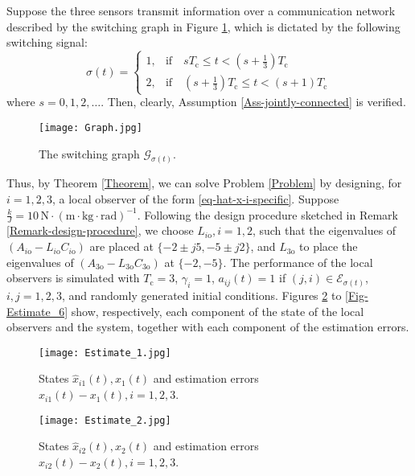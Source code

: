 \documentclass[twocolumn]{autart}
\begin{document}
Suppose the three sensors transmit information over a communication network
described by the switching graph in Figure \ref{Fig-Graph},
which is dictated by the following switching signal:
\begin{equation*}
    \sigma(t)=
    \begin{cases}
   1, & \text{if}\quad  s T_{\text{c}} \le t < \left(s+\frac{1}{3}\right) T_{\text{c}}   \\
   2, & \text{if}\quad  \left(s+\frac{1}{3}\right)T_{\text{c}} \le t < (s+1) T_{\text{c}}
    \end{cases}
\end{equation*}
where $s=0,1,2,\ldots$. Then, clearly, Assumption \ref{Ass-jointly-connected} is verified.

\begin{figure}
  \centering
  \texttt{[image: Graph.jpg]}\\
  \caption{The switching graph $\mathcal{G}_{\sigma(t)}$.}\label{Fig-Graph}
\end{figure}

Thus, by Theorem \ref{Theorem}, we can solve Problem \ref{Problem}
by designing, for $i=1,2,3$, a local observer of the form \eqref{eq-hat-x-i-specific}.
Suppose $\frac{k}{J}=10\, \mathrm{N} \cdot (\mathrm{m \cdot kg \cdot rad})^{-1}$.
Following the design procedure sketched in Remark \ref{Remark-design-procedure},
we choose $L_{i\text{o}}, i=1,2$, such that the eigenvalues of $(A_{i\text{o}}-L_{i\text{o}}C_{i\text{o}})$ are
placed at $\{-2\pm j 5, -5\pm j 2\}$,
and $L_{3\text{o}}$ to place the eigenvalues of $(A_{3\text{o}}-L_{3\text{o}}C_{3\text{o}})$ at $\{-2,-5\}$.
The performance of the local observers is simulated with
$T_{\text{c}}=3$, $\gamma_{i}=1$, $a_{ij}(t)=1$ if $(j,i) \in \mathcal{E}_{\sigma(t)}$, $i,j=1,2,3$, and
randomly generated initial conditions.
Figures \ref{Fig-Estimate_1} to \ref{Fig-Estimate_6} show, respectively,
each component of the state of the local observers and the system,
together with each component of the estimation errors.


\begin{figure}
\centering
  \texttt{[image: Estimate\_1.jpg]}\\
  \caption{States $\hat{x}_{i1}(t), x_{1}(t)$ and estimation errors $\hat{x}_{i1}(t)-x_{1}(t),i=1,2,3$.}\label{Fig-Estimate_1}
\end{figure}


\begin{figure}
\centering
  \texttt{[image: Estimate\_2.jpg]}\\
  \caption{States $\hat{x}_{i2}(t), x_{2}(t)$ and estimation errors $\hat{x}_{i2}(t)-x_{2}(t),i=1,2,3$.}\label{Fig-Estimate_2}
\end{figure}
\end{document}

